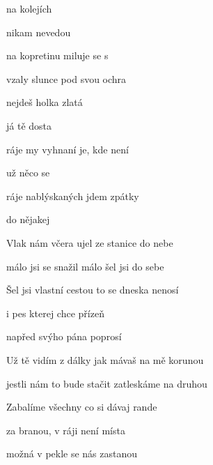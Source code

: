 

\zs
{} na kolejích

 nikam nevedou   

 na kopretinu  miluje se s 

 vzaly slunce  pod svou ochra 

 nejdeš holka zlatá

 já tě dosta 
\ks

\zr
{} ráje my vyhnaní je, kde není

už   něco se  

 ráje nablýskaných  jdem zpátky

do   nějakej  
\kr

\zs
Vlak nám včera ujel ze stanice do nebe

málo jsi se snažil málo šel jsi do sebe

Šel jsi vlastní cestou to se dneska nenosí

i pes kterej chce přízeň

napřed svýho pána poprosí
\ks

\zs
Už tě vidím z dálky jak mávaš na mě korunou

jestli nám to bude stačit zatleskáme na druhou

Zabalíme všechny co si dávaj rande

za branou, v ráji není místa

možná v pekle se nás zastanou
\ks

\kp





